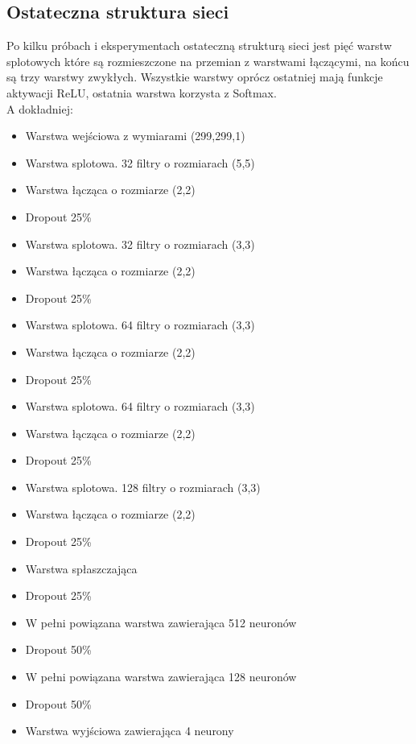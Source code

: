 \documentclass{article}
\begin{document}
\subsection{Ostateczna struktura sieci}
Po kilku próbach i eksperymentach ostateczną strukturą sieci jest pięć warstw splotowych które są rozmieszczone na przemian z warstwami łączącymi, na końcu są trzy warstwy zwykłych. Wszystkie warstwy oprócz ostatniej mają funkcje aktywacji ReLU, ostatnia warstwa korzysta z Softmax.\\

A dokładniej:
\begin{itemize}
	\item Warstwa wejściowa z wymiarami (299,299,1)
	
	\item Warstwa splotowa. 32 filtry o rozmiarach (5,5)
	\item Warstwa łącząca o rozmiarze (2,2)
	\item Dropout 25\%
	
	\item Warstwa splotowa. 32 filtry o rozmiarach (3,3)
	\item Warstwa łącząca o rozmiarze (2,2)
	\item Dropout 25\%
	
	\item Warstwa splotowa. 64 filtry o rozmiarach (3,3)
	\item Warstwa łącząca o rozmiarze (2,2)
	\item Dropout 25\%
	
	\item Warstwa splotowa. 64 filtry o rozmiarach (3,3)
	\item Warstwa łącząca o rozmiarze (2,2)
	\item Dropout 25\%
	
	\item Warstwa splotowa. 128 filtry o rozmiarach (3,3)
	\item Warstwa łącząca o rozmiarze (2,2)
	\item Dropout 25\%
	
	\item Warstwa spłaszczająca
	\item Dropout 25\%
	
	\item W pełni powiązana warstwa zawierająca 512 neuronów
	\item Dropout 50\%
	
	\item W pełni powiązana warstwa zawierająca 128 neuronów
	\item Dropout 50\%
	
	\item Warstwa wyjściowa zawierająca 4 neurony
\end{itemize}
\end{document}

